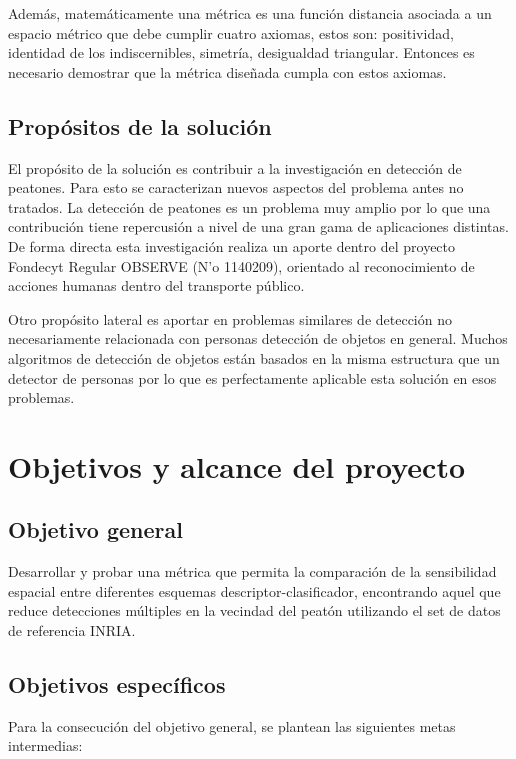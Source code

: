 Además, matemáticamente una métrica es una función distancia asociada a un espacio métrico que debe cumplir cuatro axiomas, estos son: positividad, identidad de los indiscernibles, simetría, desigualdad triangular. Entonces es necesario demostrar que la métrica diseñada cumpla con estos axiomas. 

\subsection{Propósitos de la solución}

El propósito de la solución es contribuir a la investigación en detección de peatones. Para esto se caracterizan nuevos aspectos del problema antes no tratados. La detección de peatones es un problema muy amplio por lo que una contribución tiene repercusión a nivel de una gran gama de aplicaciones distintas. 
De forma directa esta investigación realiza un aporte dentro del proyecto Fondecyt Regular OBSERVE (N'o 1140209), orientado al reconocimiento de acciones humanas dentro del transporte público.

Otro propósito lateral es aportar en problemas similares de detección no necesariamente relacionada con personas \ie detección de objetos en general. Muchos algoritmos de detección de objetos están basados en la misma estructura que un detector de personas por lo que es perfectamente aplicable esta solución en esos problemas.

\section{Objetivos y alcance del proyecto}
\label{intro:objetivos}

\subsection{Objetivo general}

Desarrollar y probar una métrica que permita la comparación de la sensibilidad espacial entre diferentes esquemas descriptor-clasificador, encontrando aquel que reduce detecciones múltiples en la vecindad del peatón utilizando el set de datos de referencia INRIA.

\subsection{Objetivos específicos}

Para la consecución del objetivo general, se plantean las siguientes metas intermedias:

